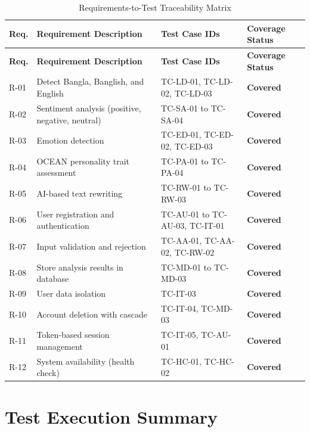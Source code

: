 \documentclass[12pt,a4paper]{report}
\begin{document}
\begin{itemize}
\begin{longtable}{|p{0.6cm}|p{4.5cm}|p{3cm}|p{4.5cm}|}
\caption{Requirements-to-Test Traceability Matrix} \label{tab:rtm} \\
\hline
\textbf{Req.} & \textbf{Requirement Description} & \textbf{Test Case IDs} & \textbf{Coverage Status} \\
\hline
\endfirsthead
\hline
\textbf{Req.} & \textbf{Requirement Description} & \textbf{Test Case IDs} & \textbf{Coverage Status} \\
\hline
\endhead
R-01 & Detect Bangla, Banglish, and English & TC-LD-01, TC-LD-02, TC-LD-03 & \textbf{Covered} \\
\hline
R-02 & Sentiment analysis (positive, negative, neutral) & TC-SA-01 to TC-SA-04 & \textbf{Covered} \\
\hline
R-03 & Emotion detection & TC-ED-01, TC-ED-02, TC-ED-03 & \textbf{Covered} \\
\hline
R-04 & OCEAN personality trait assessment & TC-PA-01 to TC-PA-04 & \textbf{Covered} \\
\hline
R-05 & AI-based text rewriting & TC-RW-01 to TC-RW-03 & \textbf{Covered} \\
\hline
R-06 & User registration and authentication & TC-AU-01 to TC-AU-03, TC-IT-01 & \textbf{Covered} \\
\hline
R-07 & Input validation and rejection & TC-AA-01, TC-AA-02, TC-RW-02 & \textbf{Covered} \\
\hline
R-08 & Store analysis results in database & TC-MD-01 to TC-MD-03 & \textbf{Covered} \\
\hline
R-09 & User data isolation & TC-IT-03 & \textbf{Covered} \\
\hline
R-10 & Account deletion with cascade & TC-IT-04, TC-MD-03 & \textbf{Covered} \\
\hline
R-11 & Token-based session management & TC-IT-05, TC-AU-01 & \textbf{Covered} \\
\hline
R-12 & System availability (health check) & TC-HC-01, TC-HC-02 & \textbf{Covered} \\
\hline
\end{longtable}

\section{Test Execution Summary}


\end{itemize}
\end{document}
